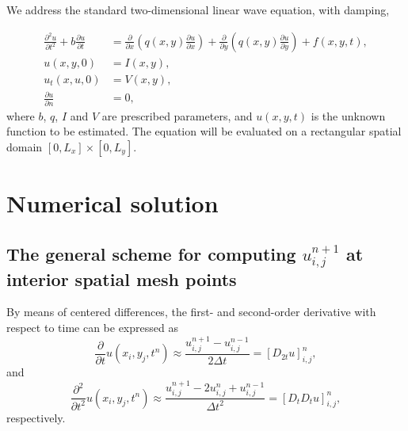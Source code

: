 \documentclass[twoside]{article}
\begin{document}
\label{math:problem}

 

We address the standard two-dimensional linear wave equation, with damping,

\begin{align}
\frac{\partial^2 u}{\partial t^2} + b\frac{\partial u}{\partial t} &= \frac{\partial}{\partial x} \left( q(x,y) \frac{\partial u}{\partial x} \right) + \frac{\partial}{\partial y} \left( q(x,y) \frac{\partial u}{\partial y} \right) + f(x,y,t), \label{eq:wave}\\
u(x,y,0)  &= I(x,y),                         \label{initial:values}\\
u_t(x,u,0) &= V(x,y),                         \label{initial:values:t}\\
\frac{\partial u}{\partial n} &= 0,
\end{align}
where $b$, $q$, $I$ and $V$ are prescribed parameters, and $u(x,y,t)$ is
the unknown function to be estimated. The equation will be evaluated on a 
rectangular spatial domain $\left[0, L_x \right] \times \left[0, L_y \right]$.



\section{Numerical solution}
\label{numerical:problem}
  

\subsection{The general scheme for computing $u_{i,j}^{n+1}$ at interior spatial mesh points}

By means of centered differences, the first- and second-order derivative with respect to time can be expressed as
\begin{equation*}
\frac{\partial}{\partial t} u(x_i, y_j, t^n) \approx \frac{u_{i,j}^{n+1} - u_{i,j}^{n-1}}{2\Delta t} = [D_{2t} u]_{i,j}^n,
\end{equation*}
and
\begin{equation*}
\frac{\partial^2}{\partial t^2} u(x_i, y_j, t^n) \approx \frac{u_{i,j}^{n+1} - 2u_{i,j}^n + u_{i,j}^{n-1}} {\Delta t^2} = \left[D_t D_t u \right]_{i,j}^n,
\end{equation*}
respectively. 
\end{document}
